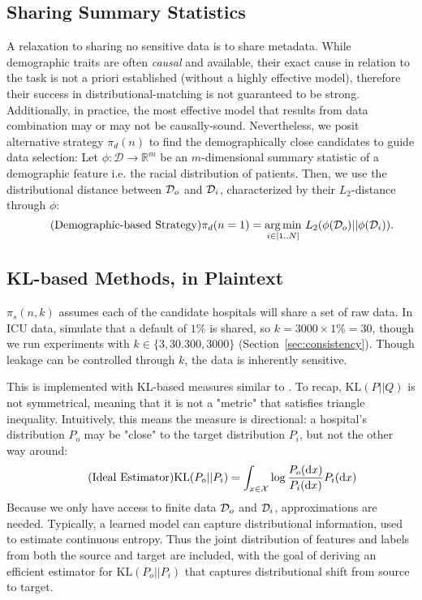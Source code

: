 \subsection{Sharing Summary Statistics}
A relaxation to sharing no sensitive data is to share metadata. While demographic traits are often \emph{causal} and available, their exact cause in relation to the task is not a priori established (without a highly effective model), therefore their success in distributional-matching is not guaranteed to be strong. Additionally, in practice, the most effective model that results from data combination may or may not be causally-sound. Nevertheless, we posit alternative strategy
$\pi_d(n)$ to find the demographically close candidates to guide data selection: Let $\phi:\mathcal{D}\to\mathbb{R}^m$ be an $m$-dimensional summary statistic of a demographic feature i.e. the racial distribution of patients. Then, we use the distributional distance between $\mathcal{D}_o$ and $\mathcal{D}_i$, characterized by their $L_2$-distance through $\phi$:
\begin{equation}
\tag{Demographic-based Strategy}
\pi_d (n=1) = \operatorname*{arg\,min} _{i\in [1..N]} \, L_2(\phi(\mathcal{D}_o) || \phi(\mathcal{D}_i)).
\end{equation}

\subsection{KL-based Methods, in Plaintext}
$\pi_s(n, k)$ assumes each of the candidate hospitals will share a set of raw data. In ICU data, simulate that a default of $1\%$ is shared, so $k=3000\times 1\% = 30$, though we run experiments with $k\in\{3, 30. 300, 3000\}$ (Section~\ref{sec:consistency}). Though leakage can be controlled through $k$, the data is inherently sensitive.

This is implemented with KL-based measures similar to \priorp. To recap, $\mathrm{KL}(P||Q)$ is not symmetrical, meaning that it is not a "metric" that satisfies triangle inequality. Intuitively, this means the measure is directional: a hospital's distribution $P_o$ may be "close" to the target distribution $P_i$, but not the other way around:
\begin{equation}
\tag{Ideal Estimator}
\mathrm{KL}(P_o||P_i) = \int_{x\in \mathcal{X}} \log\frac{P_o(\mathop{}\!\mathrm{d} x)}{P_i(\mathop{}\!\mathrm{d} x)}P_i(\mathop{}\!\mathrm{d} x)
\end{equation}
Because we only have access to finite data $\mathcal{D}_o$ and $\mathcal{D}_i$, approximations are needed.
Typically, a learned model can capture distributional information, used to estimate continuous entropy.
Thus the joint distribution of features and labels from both the source and target are included, with the goal of deriving an efficient estimator for $\mathrm{KL}(P_o||P_i)$ that captures distributional shift from source to target.

